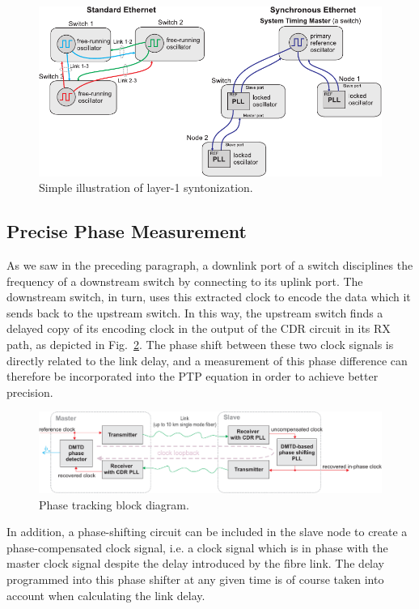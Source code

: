 \documentclass{../JAC2003}
\begin{document}
\begin{figure}[htb]
   \centering
   \includegraphics*[width=\columnwidth]{misc/eth_vs_synce.pdf}
   \caption{Simple illustration of layer-1 syntonization.}
   \label{synce-fig}
\end{figure}

\subsection{Precise Phase Measurement}

As we saw in the preceding paragraph, a downlink port of a switch
disciplines the frequency of a downstream switch by connecting to its
uplink port. The downstream switch, in turn, uses this extracted clock
to encode the data which it sends back to the upstream switch. In this
way, the upstream switch finds a delayed copy of its encoding clock in
the output of the CDR circuit in its RX path, as depicted in
Fig.~\ref{phase-tracking-fig}. The phase shift between these two clock
signals is directly related to the link delay, and a measurement of
this phase difference can therefore be incorporated into the PTP
equation in order to achieve better precision. 

\begin{figure}[htb]
   \centering
   \includegraphics*[width=\columnwidth]{misc/phase_tracking.pdf}
   \caption{Phase tracking block diagram.}
   \label{phase-tracking-fig}
\end{figure}

In addition, a phase-shifting circuit can be included in the slave
node to create a phase-compensated clock signal, i.e. a clock signal
which is in phase with the master clock signal despite the delay
introduced by the fibre link. The delay programmed into this phase
shifter at any given time is of course taken into account when
calculating the link delay.
\end{document}
